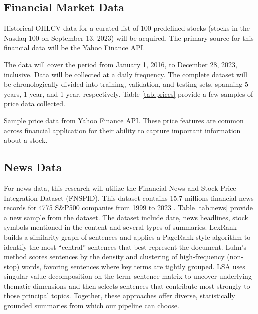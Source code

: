 \subsection{Financial Market Data}
Historical \gls{OHLCV} data for a curated list of 100 predefined stocks (stocks in the Nasdaq-100 on September 13, 2023) will be acquired. The primary source for this financial data will be the Yahoo Finance API. 

The data will cover the period from January 1, 2016, to December 28, 2023, inclusive. Data will be collected at a daily frequency. The complete dataset will be chronologically divided into training, validation, and testing sets, spanning 5 years, 1 year, and 1 year, respectively. Table \ref{tab:prices} provide a few samples of price data collected.

\begin{table}
  \centering
  \small
  \caption{Sample price data from Yahoo Finance API. These price features are common across financial application for their ability to capture important information about a stock.}
  \label{tab:prices}
\end{table}

\subsection{News Data}
For news data, this research will utilize the Financial News and Stock Price Integration Dataset (FNSPID). This dataset contains 15.7 millions financial news records for 4775 S\&P500 companies from 1999 to 2023 \cite{Dong2024}. Table \ref{tab:news} provide a new sample from the dataset. The dataset include date, news headlines, stock symbols mentioned in the content and several types of summaries. LexRank builds a similarity graph of sentences and applies a PageRank‐style algorithm to identify the most “central” sentences that best represent the document. Luhn's method scores sentences by the density and clustering of high‐frequency (non‐stop) words, favoring sentences where key terms are tightly grouped. \gls{LSA} uses singular value decomposition on the term–sentence matrix to uncover underlying thematic dimensions and then selects sentences that contribute most strongly to those principal topics. Together, these approaches offer diverse, statistically grounded summaries from which our pipeline can choose.

